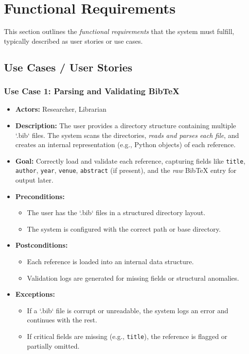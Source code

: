 \documentclass[12pt]{article}
\begin{document}
\newpage

\section{Functional Requirements}

This section outlines the \emph{functional requirements} that the system must fulfill, typically described as user stories or use cases.

\subsection{Use Cases / User Stories}

\subsubsection{Use Case 1: Parsing and Validating BibTeX}
\begin{itemize}
  \item \textbf{Actors:} Researcher, Librarian
  \item \textbf{Description:} The user provides a directory structure containing multiple `.bib` files. The system scans the directories, \emph{reads and parses each file}, and creates an internal representation (e.g., Python objects) of each reference.
  \item \textbf{Goal:} Correctly load and validate each reference, capturing fields like \texttt{title}, \texttt{author}, \texttt{year}, \texttt{venue}, \texttt{abstract} (if present), and the \emph{raw} BibTeX entry for output later.
  \item \textbf{Preconditions:} 
    \begin{itemize}
      \item The user has the `.bib` files in a structured directory layout.
      \item The system is configured with the correct path or base directory.
    \end{itemize}
  \item \textbf{Postconditions:}
    \begin{itemize}
      \item Each reference is loaded into an internal data structure.
      \item Validation logs are generated for missing fields or structural anomalies.
    \end{itemize}
  \item \textbf{Exceptions:}
    \begin{itemize}
      \item If a `.bib` file is corrupt or unreadable, the system logs an error and continues with the rest.
      \item If critical fields are missing (e.g., \texttt{title}), the reference is flagged or partially omitted.
    \end{itemize}
\end{itemize}
\end{document}
